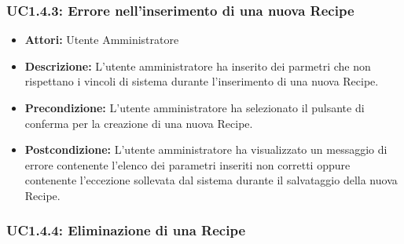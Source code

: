 \subsubsection{UC1.4.3: Errore nell'inserimento di una nuova Recipe}

\begin{itemize}
    \item \textbf{Attori:} Utente Amministratore
    \item \textbf{Descrizione:} L'utente amministratore ha inserito dei parmetri che non rispettano i vincoli di sistema durante l'inserimento di una nuova Recipe.
    \item \textbf{Precondizione:} L'utente amministratore ha selezionato il pulsante di conferma per la creazione di una nuova Recipe.
    \item \textbf{Postcondizione:} L'utente amministratore ha visualizzato un messaggio di errore contenente l'elenco dei parametri inseriti non corretti oppure contenente l'eccezione sollevata dal sistema durante il salvataggio della nuova Recipe.
\end{itemize}

\subsubsection{UC1.4.4: Eliminazione di una Recipe}

